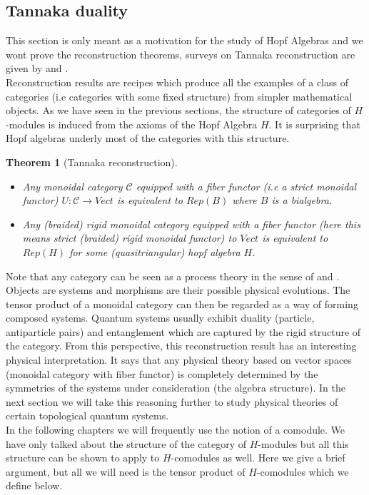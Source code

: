 \documentclass{article}
\newtheorem{theorem}{Theorem}
\newcommand{\cat}{\mathcal{C}}
\begin{document}
\subsection{Tannaka duality}\label{Tannakaduality}
This section is only meant as a motivation for the study of Hopf Algebras and we wont prove the reconstruction theorems, surveys on Tannaka reconstruction are given by \cite{Vercruysse12} and \cite{Joyal91}.\\
Reconstruction results are recipes which produce all the examples of a class of categories (i.e categories with some fixed structure) from simpler mathematical objects. As we have seen in the previous sections, the structure of categories of $H$-modules is induced from the axioms of the Hopf Algebra $H$. It is surprising that Hopf algebras underly most of the categories with this structure.
\begin{theorem}[Tannaka reconstruction]
	\begin{itemize}
		\item Any monoidal category $\cat$ equipped with a fiber functor (i.e a strict monoidal functor) $U: \cat \rightarrow Vect$ is equivalent to $Rep(B)$ where $B$ is a bialgebra.
		\item Any (braided) rigid monoidal category equipped with a fiber functor (here this means strict (braided) rigid monoidal functor) to $Vect$ is equivalent to $Rep(H)$ for some (quasitriangular) hopf algebra $H$.
	\end{itemize}
\end{theorem}
Note that any category can be seen as a process theory in the sense of \cite{Abramsky04} and \cite{Coecke17}. Objects are systems and morphisms are their possible physical evolutions. The tensor product of a monoidal category can then be regarded as a way of forming composed systems. Quantum systems usually exhibit duality (particle, antiparticle pairs) and entanglement which are captured by the rigid structure of the category. From this perspective, this reconstruction result has an interesting physical interpretation. It says that any physical theory based on vector spaces (monoidal category with fiber functor) is completely determined by the symmetries of the systems under consideration (the algebra structure). In the next section we will take this reasoning further to study physical theories of certain topological quantum systems.\\
In the following chapters we will frequently use the notion of a comodule. We have only talked about the structure of the category of $H$-modules but all this structure can be shown to apply to $H$-comodules as well. Here we give a brief argument, but all we will need is the tensor product of $H$-comodules which we define below.
\end{document}
